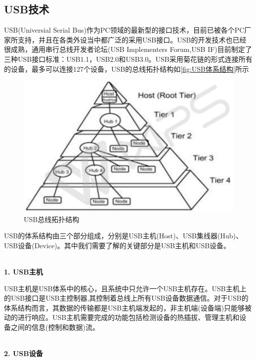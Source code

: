 \subsection{USB技术}
	USB(Universial Serial Bus)作为PC领域的最新型的接口技术，目前已被各个PC厂家所支持，并且在各类外设当中都广泛的采用USB接口。USB的开发技术也已经很成熟，通用串行总线开发者论坛(USB Implementers Forum,USB IF)目前制定了三种USB接口标准：USB1.1，USB2.0和USB3.0。USB采用菊花链的形式连接所有的设备，最多可以连接127个设备，USB的总线拓扑结构如\autoref{fig:USB体系结构}所示
\begin{figure}[!h]
\centering
\includegraphics[width=1.0\textwidth]{./graphics/usb-structure.pdf}
\caption{USB总线拓扑结构}\label{fig:USB体系结构}
\end{figure}


USB的体系结构由三个部分组成，分别是USB主机(Host)、USB集线器(Hub)、USB设备(Device)。其中我们需要了解的关键部分是USB主机和USB设备。

\\
	
\noindent \textbf{1. USB主机}
	
	USB主机是USB体系中的核心，且系统中只允许一个USB主机存在。USB主机上的USB接口是USB主控制器,其控制着总线上所有USB设备数据通信。对于USB的体系结构而言，其数据的传输都是USB主机端发起的，非主机端(设备端)只能够被动的进行响应。USB主机需要完成的功能包括检测设备的热插拔、管理主机和设备之间的信息(控制和数据)流\cite{李雪红2004USB}\cite{莫宏伟2001USB}。


\\

\noindent \textbf{2. USB设备}

